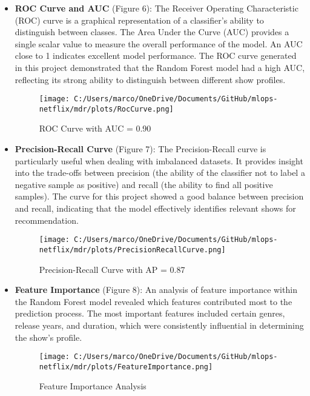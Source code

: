 \documentclass[sigconf]{acmart}
\begin{document}
\begin{itemize}
\begin{figure}[H]
			\label{fig:Confusion_Matrix}
		\end{figure}
		\FloatBarrier
		\item \textbf{ROC Curve and AUC} (Figure 6): The Receiver Operating Characteristic (ROC) curve is a graphical representation of a classifier's ability to distinguish between classes. The Area Under the Curve (AUC) provides a single scalar value to measure the overall performance of the model. An AUC close to 1 indicates excellent model performance. The ROC curve generated in this project demonstrated that the Random Forest model had a high AUC, reflecting its strong ability to distinguish between different show profiles.
		\begin{figure}[H]
			\centering
			\texttt{[image: C:/Users/marco/OneDrive/Documents/GitHub/mlops-netflix/mdr/plots/RocCurve.png]}
			\caption{ROC Curve with AUC = 0.90}
			\label{fig:roc_curve}
		\end{figure}
		\FloatBarrier
		\item \textbf{Precision-Recall Curve} (Figure 7): The Precision-Recall curve is particularly useful when dealing with imbalanced datasets. It provides insight into the trade-offs between precision (the ability of the classifier not to label a negative sample as positive) and recall (the ability to find all positive samples). The curve for this project showed a good balance between precision and recall, indicating that the model effectively identifies relevant shows for recommendation.
		\begin{figure}[H]
			\centering
			\texttt{[image: C:/Users/marco/OneDrive/Documents/GitHub/mlops-netflix/mdr/plots/PrecisionRecallCurve.png]}
			\caption{Precision-Recall Curve with AP = 0.87}
			\label{fig:precision_recall_curve}
		\end{figure}
		\FloatBarrier
		\item \textbf{Feature Importance} (Figure 8): An analysis of feature importance within the Random Forest model revealed which features contributed most to the prediction process. The most important features included certain genres, release years, and duration, which were consistently influential in determining the show's profile.
		\begin{figure}[H]
			\centering
			\texttt{[image: C:/Users/marco/OneDrive/Documents/GitHub/mlops-netflix/mdr/plots/FeatureImportance.png]}
			\caption{Feature Importance Analysis}
			\label{fig:feature_importance}
		\end{figure}
		\FloatBarrier
	\end{itemize}
\end{document}

